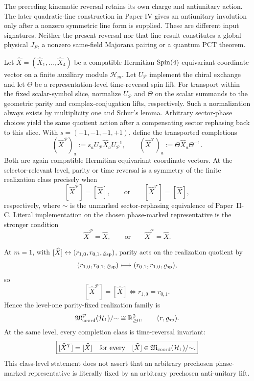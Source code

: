 \documentclass[12pt,a4paper]{article}
\begin{document}
\begin{remark}
\label{p2d:rem:reversal-line-reality-scope}
The preceding kinematic reversal retains its own charge and
antiunitary action.  The later quadratic-line construction in
Paper IV gives an antiunitary involution only after a nonzero
symmetric line form is supplied.  These are different input
signatures.  Neither the present reversal nor that line result
constitutes a global physical \(J_F\), a nonzero same-field
Majorana pairing or a quantum PCT theorem.
\end{remark}


\begin{proposition}
\label{p2d:prop:finite-completion-discrete-symmetry-scope}
Let \(\widehat X=(\widehat X_1,\ldots,\widehat X_4)\) be a compatible
Hermitian \(\mathrm{Spin}(4)\)-equivariant coordinate vector on a finite auxiliary
module \(\mathcal H_m\).  Let \(U_{\mathcal P}\) implement the chiral
exchange and let \(\Theta\) be a representation-level time-reversal spin
lift.
For transport within the fixed scalar-symbol slice, normalize
\(U_{\mathcal P}\) and \(\Theta\) on the scalar summands to the geometric
parity and complex-conjugation lifts, respectively.  Such a normalization
always exists by multiplicity one and Schur's lemma.  Arbitrary sector-phase
choices yield the same quotient action after a compensating sector
rephasing back to this slice.
With \(s=(-1,-1,-1,+1)\), define the transported completions
\[
 (\widehat X^{\mathcal P})_a
 :=s_aU_{\mathcal P}\widehat X_aU_{\mathcal P}^{-1},
 \qquad
 (\widehat X^{\mathcal T})_a
 :=\Theta\widehat X_a\Theta^{-1}.
\]
Both are again compatible Hermitian equivariant coordinate vectors.  At the
selector-relevant level, parity or time reversal is a symmetry of the finite
realization class precisely when
\[
 [\widehat X^{\mathcal P}]=[\widehat X],
 \qquad\text{or}\qquad
 [\widehat X^{\mathcal T}]=[\widehat X],
\]
respectively, where \({\sim}\) is the unmarked sector-rephasing equivalence of
Paper~II-C.  Literal implementation on the chosen phase-marked representative
is the stronger condition
\[
 \widehat X^{\mathcal P}=\widehat X,
 \qquad\text{or}\qquad
 \widehat X^{\mathcal T}=\widehat X.
\]

At \(m=1\), with
\([\widehat X]\leftrightarrow(r_{1,0},r_{0,1},\varrho_{\rm sp})\), parity
acts on the realization quotient by
\[
 (r_{1,0},r_{0,1},\varrho_{\rm sp})
 \longmapsto
 (r_{0,1},r_{1,0},\varrho_{\rm sp}),
\]
so
\[
 \boxed{
 [\widehat X^{\mathcal P}]=[\widehat X]
 \Longleftrightarrow
 r_{1,0}=r_{0,1}.}
\]
Hence the level-one parity-fixed realization family is
\[
 \mathfrak M_{\rm coord}^{\mathcal P}(\mathcal H_1)/{\sim}
 \cong\mathbb R_{\ge0}^{2},
 \qquad (r,\varrho_{\rm sp}).
\]
At the same level, every completion class is time-reversal invariant:
\[
 \boxed{
 [\widehat X^{\mathcal T}]=[\widehat X]
 \quad\text{for every}\quad
 [\widehat X]\in
 \mathfrak M_{\rm coord}(\mathcal H_1)/{\sim}.}
\]
This class-level statement does not assert that an arbitrary prechosen
phase-marked representative is literally fixed by an arbitrary prechosen
anti-unitary lift.


\end{proposition}
\end{document}
